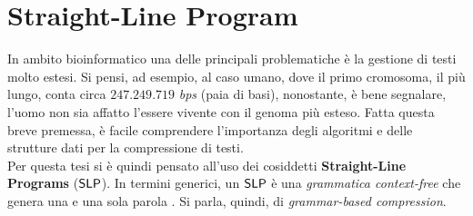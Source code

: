 \section{Straight-Line Program}
\label{slpsec}
In ambito bioinformatico una delle principali problematiche è la
gestione di testi molto estesi. Si pensi, ad esempio, al caso umano, dove il
primo cromosoma, il più lungo, conta circa $247.249.719$
\textit{bps} (paia di basi), nonostante, è bene segnalare, l'uomo
non sia affatto l'essere vivente con il genoma più esteso. Fatta questa breve
premessa, è facile comprendere l'importanza degli algoritmi e delle strutture
dati per la compressione di testi.\\
Per questa tesi si è quindi pensato all'uso dei cosiddetti \textbf{Straight-Line
  Programs} ($\mbox{\rm {\sf SLP}}$). In termini 
generici, un $\mbox{\rm {\sf SLP}}$ è una \textit{grammatica context-free} che 
genera una e una sola parola \cite{slpsurvey}. Si parla, quindi, di
\textit{grammar-based compression}.
